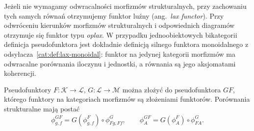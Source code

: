 Jeżeli nie wymagamy odwracalności morfizmów strukturalnych, przy zachowaniu tych samych równań otrzymujemy funktor luźny (ang.\ \emph{lax functor}). Przy odwróceniu kierunków morfizmów strukturalnych i odpowiednich diagramów otrzymuje się funktor typu \emph{oplax}. W przypadku jednoobiektowych bikategorii definicja pseudofunktora jest dokładnie definicją silnego funktora monoidalnego z odsyłacza~\ref{cat:def:lax-monoidal}: funktor na jedynej kategorii morfizmów ma odwracalne porównania iloczynu i jednostki, a równania są jego aksjomatami koherencji.

\begin{stwierdzenie}\label{cat:prop:pseudofunctor-composition}
Pseudofunktory $F:\mathcal K\to\mathcal L$, $G:\mathcal L\to\mathcal M$ można złożyć do pseudofunktora $GF$, którego funktory na kategoriach morfizmów są złożeniami funktorów. Porównania strukturalne mają postać
\[
 \phi^{GF}_{g,f}=G(\phi^F_{g,f})\circ\phi^G_{Fg,Ff},
 \qquad
 \phi^{GF}_A=G(\phi^F_A)\circ\phi^G_{FA}.
\]
\end{stwierdzenie}
